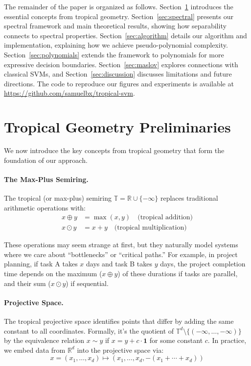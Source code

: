 \documentclass{article}
\newcommand{\R}{\mathbb{R}}
\newcommand{\trop}{\mathbb{T}}
\begin{document}
The remainder of the paper is organized as follows. Section~\ref{sec:prelim} introduces the essential concepts from tropical geometry. Section~\ref{sec:spectral} presents our spectral framework and main theoretical results, showing how separability connects to spectral properties. Section~\ref{sec:algorithm} details our algorithm and implementation, explaining how we achieve pseudo-polynomial complexity. Section~\ref{sec:polynomials} extends the framework to polynomials for more expressive decision boundaries. Section~\ref{sec:maslov} explores connections with classical SVMs, and Section~\ref{sec:discussion} discusses limitations and future directions. The code to reproduce our figures and experiments is available at \url{https://github.com/samuelbx/tropical-svm}.

\section{Tropical Geometry Preliminaries}\label{sec:prelim}

We now introduce the key concepts from tropical geometry that form the foundation of our approach.

\paragraph{The Max-Plus Semiring.}
The tropical (or max-plus) semiring $\trop = \R \cup \{-\infty\}$ replaces traditional arithmetic operations with:
\begin{align}
x \oplus y &= \max(x,y) \quad \text{(tropical addition)} \\
x \odot y &= x + y \quad \text{(tropical multiplication)}
\end{align}

These operations may seem strange at first, but they naturally model systems where we care about ``bottlenecks'' or ``critical paths.'' For example, in project planning, if task A takes $x$ days and task B takes $y$ days, the project completion time depends on the maximum ($x \oplus y$) of these durations if tasks are parallel, and their sum ($x \odot y$) if sequential.

\paragraph{Projective Space.}  
The tropical projective space identifies points that differ by adding the same constant to all coordinates. Formally, it's the quotient of $\trop^d \setminus \{(-\infty,\dots,-\infty)\}$ by the equivalence relation $x \sim y$ if $x = y + c \cdot \mathbf{1}$ for some constant $c$. In practice, we embed data from $\R^d$ into the projective space via:
\[
x=(x_1,\dots,x_d)\mapsto (x_1,\dots,x_d,-(x_1+\cdots+x_d))
\]
\end{document}
